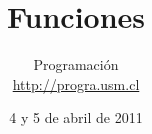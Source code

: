 \documentclass[12pt]{beamer}
\title{Funciones}
\author{
  Programación \\ \url{http://progra.usm.cl}
}
\date{4 y 5 de abril de 2011}
\begin{document}
  \begin{frame}
    \maketitle
  \end{frame}
\end{document}
